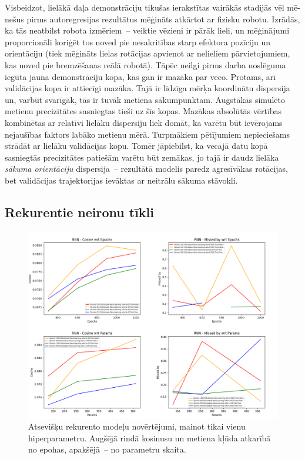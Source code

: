 \documentclass[12pt, a4paper]{article}
\numberwithin{equation}{section} %
\begin{document}
Visbeidzot, lielākā daļa demonstrāciju tikušas ierakstītas vairākās stadijās vēl mē-nešus pirms autoregresijas rezultātus mēģināts atkārtot ar fizisku robotu. Izrādās, ka tās neatbilst robota izmēriem~-- veiktie vēzieni ir pārāk lieli, un mēģinājumi proporcionāli koriģēt tos noved pie nesakritības starp efektora pozīciju un orientāciju (tiek mēģināts lielas rotācijas apvienot ar nelieliem pārvietojumiem, kas noved pie bremzēšanas reālā robotā). Tāpēc neilgi pirms darba noslēguma iegūta jauna demonstrāciju kopa, kas gan ir mazāka par veco. Protams, arī validācijas kopa ir attiecīgi mazāka.  Tajā ir līdzīga mērķa koordinātu dispersija un, varbūt svarīgāk, tās ir tuvāk metiena sākumpunktam. Augstākās simulēto metienu precizitātes sasniegtas tieši uz šīs kopas. Mazākas absolūtās vērtības kombinētas ar relatīvi lielāku dispersiju liek domāt, ka varētu būt ievērojams nejaušības faktors labāko metienu mērā. Turpmākiem pētījumiem nepieciešams strādāt ar lielāku validācijas kopu. Tomēr jāpiebilst, ka vecajā datu kopā sasniegtās precizitātes patiešām varētu būt zemākas, jo tajā ir daudz lielāka \textit{sākuma orientāciju} dispersija~-- rezultātā modelis paredz agresīvākas rotācijas, bet validācijas trajektorijas ievāktas ar neitrālu sākuma stāvokli.

\subsection{Rekurentie neironu tīkli}

\begin{figure}[t!]
    \centering
    \includegraphics[width=16cm,page=74]{../img/rnn-independent-params-epoch.png}
    \caption{Atsevišķu rekurento modeļu novērtējumi, mainot tikai vienu hiperparametru. Augšējā rindā kosinusu un metiena kļūda atkarībā no epohas, apakšējā~-- no parametru skaita.}
    \label{rnn_independent}
\end{figure}
\end{document}
